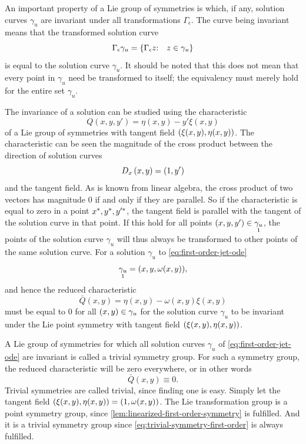 An important property of a Lie group of symmetries is which, if any, solution curves \(\gamma_u\) are invariant under all transformations \(\Gamma_\epsilon\).
The curve being invariant means that the transformed solution curve
\begin{equation}
  \Gamma_\epsilon \gamma_u = \qty{\Gamma_\epsilon z \qq*{:} z \in \gamma_u}
\end{equation}
is equal to the solution curve \(\gamma_u\).
It should be noted that this does not mean that every point in \(\gamma_u\) need be transformed to itself; the equivalency must merely hold for the entire set \(\gamma_u\).

The invariance of a solution can be studied using the characteristic
\begin{equation}
  Q(x, y, y') = \eta(x, y) - y' \xi(x, y)
\end{equation}
of a Lie group of symmetries with tangent field \(\pqty{\xi(x,y), \eta(x,y)}\).
The characteristic can be seen the magnitude of the cross product between the direction of solution curves
\begin{equation}
  \tD{x} \pqty{x, y} = \pqty{1, y'}
\end{equation}
and the tangent field.
As is known from linear algebra, the cross product of two vectors has magnitude 0 if and only if they are parallel.
So if the characteristic is equal to zero in a point \(\fixed{x}, \fixed{y}, \fixed{y'}\), the tangent field is parallel with the tangent of the solution curve in that point.
If this hold for all points \(\qty(x, y, y') \in \prolong{\gamma_u}{1}\), the points of the solution curve \(\gamma_u\) will thus always be transformed to other points of the same solution curve.
For a solution \(\gamma_u\) to \cref{eq:first-order-jet-ode}
\begin{equation}
  \prolong{\gamma_u}{1} = \qty(x, y, \omega(x, y)),
\end{equation}
and hence the reduced characteristic
\begin{equation}
  \bar{Q}(x, y) = \eta(x, y) - \omega(x, y) \xi(x, y)
\end{equation}
must be equal to \(0\) for all \(\qty(x, y) \in \gamma_u\) for the solution curve \(\gamma_u\) to be invariant under the Lie point symmetry with tangent field \(\pqty{\xi(x,y), \eta(x,y)}\).

A Lie group of symmetries for which all solution curves \(\gamma_u\) of \cref{eq:first-order-jet-ode} are invariant is called a trivial symmetry group.
For such a symmetry group, the reduced characteristic will be zero everywhere, or in other words
\begin{equation} \label{eq:trivial-symmetry-first-order}
  \bar{Q}(x, y) \equiv 0.
\end{equation}
Trivial symmetries are called trivial, since finding one is easy.
Simply let the tangent field \(\pqty{\xi(x,y), \eta(x,y)} = \pqty{1, \omega(x,y)}\).
The Lie transformation group is a point symmetry group, since \cref{lem:linearized-first-order-symmetry} is fulfilled.
And it is a trivial symmetry group since \cref{eq:trivial-symmetry-first-order} is always fulfilled.

